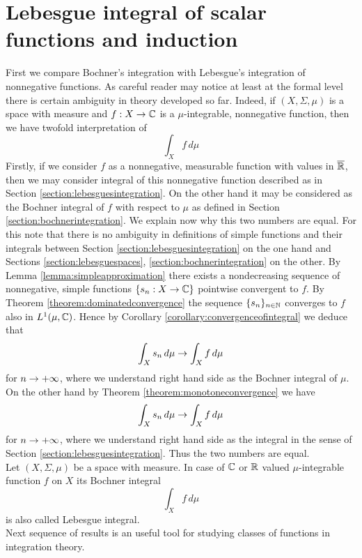 \section{Lebesgue integral of scalar functions and induction}
\noindent
First we compare Bochner's integration with Lebesgue's integration of nonnegative functions. As careful reader may notice at least at the formal level there is certain ambiguity in theory developed so far. Indeed, if $(X,\Sigma,\mu)$ is a space with measure and $f:X\rightarrow {\mathbb C}$ is a $\mu$-integrable, nonnegative function, then we have twofold interpretation of
$$\int_Xf\,d\mu$$
Firstly, if we consider $f$ as a nonnegative, measurable function with values in $\overline{{\mathbb R}}$, then we may consider integral of this nonnegative function described as in Section \ref{section:lebesguesintegration}. On the other hand it may be considered as the Bochner integral of $f$ with respect to $\mu$ as defined in Section \ref{section:bochnerintegration}. We explain now why this two numbers are equal. For this note that there is no ambiguity in definitions of simple functions and their integrals between Section \ref{section:lebesguesintegration} on the one hand and Sections \ref{section:lebesguespaces}, \ref{section:bochnerintegration} on the other. By Lemma \ref{lemma:simpleapproximation} there exists a nondecreasing sequence of nonnegative, simple functions $\{s_n:X\rightarrow {\mathbb C}\}$ pointwise convergent to $f$. By Theorem \ref{theorem:dominatedconvergence} the sequence $\{s_n\}_{n\in {\mathbb N}}$ converges to $f$ also in $L^1(\mu,{\mathbb C})$. Hence by Corollary \ref{corollary:convergenceofintegral} we deduce that
$$\int_Xs_n\,d\mu\rightarrow \int_Xf\,d\mu$$
for $n\rightarrow +\infty$, where we understand right hand side as the Bochner integral of $\mu$. On the other hand by Theorem \ref{theorem:monotoneconvergence} we have
$$\int_Xs_n\,d\mu \rightarrow \int_Xf\,d\mu$$
for $n\rightarrow +\infty$, where we understand right hand side as the integral in the sense of Section \ref{section:lebesguesintegration}. Thus the two numbers are equal.\\
Let $(X,\Sigma, \mu)$ be a space with measure. In case of ${\mathbb C}$ or ${\mathbb R}$ valued $\mu$-integrable function $f$ on $X$ its Bochner integral
$$\int_X f\,d\mu$$
is also called Lebesgue integral.\\
Next sequence of results is an useful tool for studying classes of functions in integration theory.

